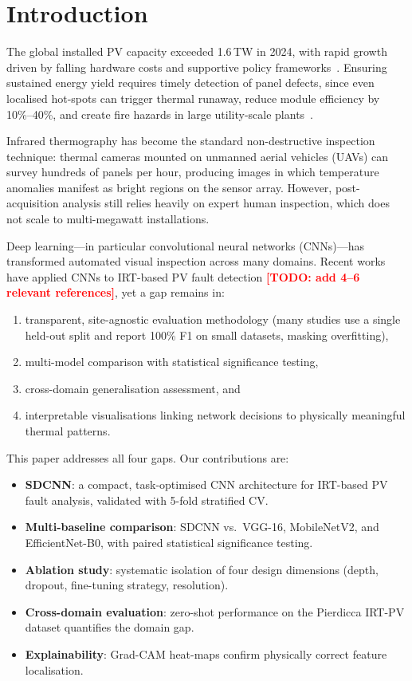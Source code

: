 \documentclass[5p,times,twocolumn]{elsarticle}
\newcommand{\todo}[1]{\textcolor{red}{\textbf{[TODO: #1]}}}
\begin{document}
\section{Introduction}
\label{sec:intro}

The global installed PV capacity exceeded 1.6\,TW in 2024,
with rapid growth driven by falling hardware costs and supportive policy
frameworks~\cite{irena2024}.
Ensuring sustained energy yield requires timely detection of panel defects,
since even localised hot-spots can trigger thermal runaway, reduce module
efficiency by 10\%--40\%, and create fire hazards
in large utility-scale plants~\cite{buerhop2018}.

Infrared thermography has become the standard non-destructive inspection
technique: thermal cameras mounted on unmanned aerial vehicles (UAVs) can
survey hundreds of panels per hour, producing images in which temperature
anomalies manifest as bright regions on the sensor array.
However, post-acquisition analysis still relies heavily on expert human
inspection, which does not scale to multi-megawatt installations.

Deep learning---in particular convolutional neural networks
(CNNs)---has transformed automated visual inspection across many domains.
Recent works have applied CNNs to IRT-based PV fault detection
\todo{add 4–6 relevant references}, yet a gap remains in:
\begin{enumerate}
  \item transparent, site-agnostic evaluation methodology
        (many studies use a single held-out split and report 100\% F1
        on small datasets, masking overfitting),
  \item multi-model comparison with statistical significance testing,
  \item cross-domain generalisation assessment, and
  \item interpretable visualisations linking network decisions to
        physically meaningful thermal patterns.
\end{enumerate}

This paper addresses all four gaps.
Our contributions are:
\begin{itemize}
  \item \textbf{SDCNN}: a compact, task-optimised CNN architecture for
        IRT-based PV fault analysis, validated with 5-fold stratified CV.
  \item \textbf{Multi-baseline comparison}: SDCNN vs.\ VGG-16, MobileNetV2,
        and EfficientNet-B0, with paired statistical significance testing.
  \item \textbf{Ablation study}: systematic isolation of four design
        dimensions (depth, dropout, fine-tuning strategy, resolution).
  \item \textbf{Cross-domain evaluation}: zero-shot performance on the
        Pierdicca IRT-PV dataset quantifies the domain gap.
  \item \textbf{Explainability}: Grad-CAM heat-maps confirm physically
        correct feature localisation.
\end{itemize}
\end{document}
